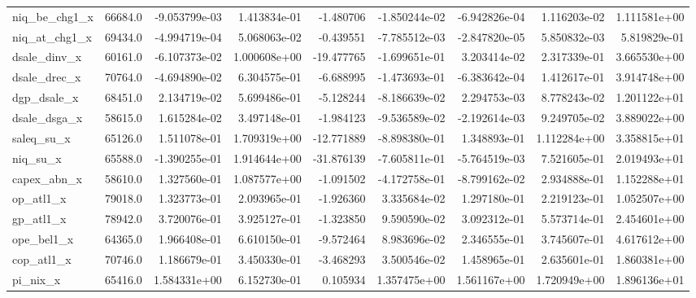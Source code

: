 \documentclass[10pt]{article}
\begin{document}
\begin{landscape}
\begin{longtable}{lrrrrrrrr}
niq\_be\_chg1\_x           &   66684.0 & -9.053799e-03 &  1.413834e-01 &     -1.480706 & -1.850244e-02 & -6.942826e-04 &  1.116203e-02 &  1.111581e+00 \\
niq\_at\_chg1\_x           &   69434.0 & -4.994719e-04 &  5.068063e-02 &     -0.439551 & -7.785512e-03 & -2.847820e-05 &  5.850832e-03 &  5.819829e-01 \\
dsale\_dinv\_x            &   60161.0 & -6.107373e-02 &  1.000608e+00 &    -19.477765 & -1.699651e-01 &  3.203414e-02 &  2.317339e-01 &  3.665530e+00 \\
dsale\_drec\_x            &   70764.0 & -4.694890e-02 &  6.304575e-01 &     -6.688995 & -1.473693e-01 & -6.383642e-04 &  1.412617e-01 &  3.914748e+00 \\
dgp\_dsale\_x             &   68451.0 &  2.134719e-02 &  5.699486e-01 &     -5.128244 & -8.186639e-02 &  2.294753e-03 &  8.778243e-02 &  1.201122e+01 \\
dsale\_dsga\_x            &   58615.0 &  1.615284e-02 &  3.497148e-01 &     -1.984123 & -9.536589e-02 & -2.192614e-03 &  9.249705e-02 &  3.889022e+00 \\
saleq\_su\_x              &   65126.0 &  1.511078e-01 &  1.709319e+00 &    -12.771889 & -8.898380e-01 &  1.348893e-01 &  1.112284e+00 &  3.358815e+01 \\
niq\_su\_x                &   65588.0 & -1.390255e-01 &  1.914644e+00 &    -31.876139 & -7.605811e-01 & -5.764519e-03 &  7.521605e-01 &  2.019493e+01 \\
capex\_abn\_x             &   58610.0 &  1.327560e-01 &  1.087577e+00 &     -1.091502 & -4.172758e-01 & -8.799162e-02 &  2.934888e-01 &  1.152288e+01 \\
op\_atl1\_x               &   79018.0 &  1.323773e-01 &  2.093965e-01 &     -1.926360 &  3.335684e-02 &  1.297180e-01 &  2.219123e-01 &  1.052507e+00 \\
gp\_atl1\_x               &   78942.0 &  3.720076e-01 &  3.925127e-01 &     -1.323850 &  9.590590e-02 &  3.092312e-01 &  5.573714e-01 &  2.454601e+00 \\
ope\_bel1\_x              &   64365.0 &  1.966408e-01 &  6.610150e-01 &     -9.572464 &  8.983696e-02 &  2.346555e-01 &  3.745607e-01 &  4.617612e+00 \\
cop\_atl1\_x              &   70746.0 &  1.186679e-01 &  3.450330e-01 &     -3.468293 &  3.500546e-02 &  1.458965e-01 &  2.635601e-01 &  1.860381e+00 \\
pi\_nix\_x                &   65416.0 &  1.584331e+00 &  6.152730e-01 &      0.105934 &  1.357475e+00 &  1.561167e+00 &  1.720949e+00 &  1.896136e+01 \\

\end{longtable}
\end{landscape}
\end{document}
